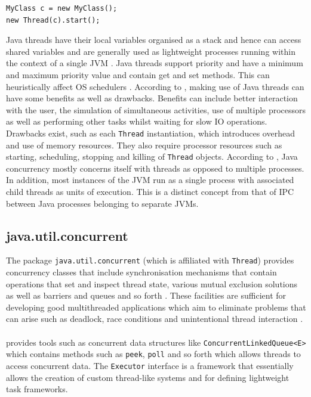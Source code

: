 \documentclass[12pt,a4paper,oneside]{article}
\def\code#1{\texttt{#1}}
\begin{document}
\begin{verbatim}
MyClass c = new MyClass();
new Thread(c).start();
\end{verbatim}
\begin{spacing}{1.4}
Java threads  have their local variables organised as a stack and hence can access shared variables and are generally used as lightweight processes running within the context of a single JVM \citep{trainBook}. Java threads support priority and have a minimum and maximum priority value and contain get and set methods. This can heuristically affect OS schedulers \citep{LeaConcurrentProgInJavaDesignPrinciplesPatterns}. According to \cite{HydeJavaThreadProg}, making use of Java threads can have some benefits as well as drawbacks. Benefits can include better interaction with the user, the simulation of simultaneous activities, use of multiple processors as well as performing other tasks whilst waiting for slow IO operations. Drawbacks exist, such as each \code{Thread} instantiation, which introduces overhead and use of memory resources. They also require processor resources such as starting, scheduling, stopping and killing of \code{Thread} objects. According to \cite{JavaAPI}, Java concurrency mostly concerns itself with threads as opposed to multiple processes. In addition, most instances of the JVM run as a single process with associated child threads as units of execution. This is a distinct concept from that of IPC between Java processes belonging to separate JVMs.  

\subsection{java.util.concurrent}
The package \code{java.util.concurrent} (which is affiliated with \code{Thread}) provides concurrency classes that include synchronisation mechanisms that contain operations that set and inspect thread state, various mutual exclusion solutions as well as barriers and queues and so forth \citep{Lea_java.util.concurrent}. These facilities are sufficient for developing good multithreaded applications which aim to eliminate problems that can arise such as deadlock, race conditions and unintentional thread interaction \citep{WellsEfficientIPCJava}. 
\\\\
\cite{JavaAPI} provides tools such as concurrent data structures like  \code{ConcurrentLinkedQueue<E>} which contains methods such as \code{peek}, \code{poll} and so forth which allows threads to access concurrent data. The \code{Executor} interface is a framework that essentially allows the creation of custom thread-like systems and for defining lightweight task frameworks.


\end{spacing}
\end{document}
